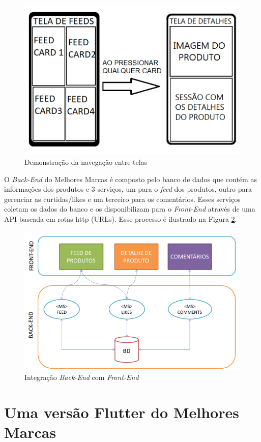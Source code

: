 \documentclass[12pt]{article}
\begin{document}
\begin{figure}[ht!]
\centering
\includegraphics[width=.8\textwidth]{imagens/Navegar telas.png}
\caption{Demonstração da navegação entre telas}
\label{fig:telas}
\end{figure}

O \textit{Back-End} do Melhores Marcas é composto pelo banco de dados que contém as informações dos produtos e 3 serviços, um para o \textit{feed} dos produtos, outro para gerenciar as curtidas/likes e um terceiro para os comentários. Esses serviços coletam os dados do banco e os disponibilizam para o \textit{Front-End} através de uma API baseada em rotas http (URLs). Esse processo é ilustrado na Figura \ref{fig:backend}.

\begin{figure}[ht!]
\centering
\includegraphics[width=.8\textwidth]{imagens/backend.png}
\caption{Integração \textit{Back-End} com \textit{Front-End}}
\label{fig:backend}
\end{figure}

\section{Uma versão Flutter do Melhores Marcas} \label{sec:versao}
\end{document}
